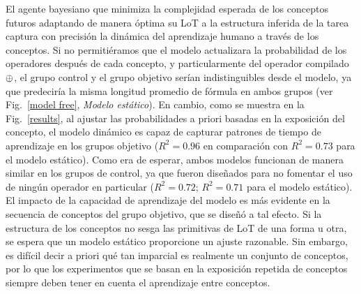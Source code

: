 El agente bayesiano que minimiza la complejidad esperada de los conceptos futuros adaptando de manera óptima su LoT a la estructura inferida de la tarea captura con precisión la dinámica del aprendizaje humano a través de los conceptos. Si no permitiéramos que el modelo actualizara la probabilidad de los operadores después de cada concepto, y particularmente del operador compilado $ \oplus $, el grupo control y el grupo objetivo serían indistinguibles desde el modelo, ya que predeciría la misma longitud promedio de fórmula en ambos grupos (ver Fig.~\ref{model free}, {\em Modelo estático}). En cambio, como se muestra en la Fig.~\ref{results}, al ajustar las probabilidades a priori basadas en la exposición del concepto, el modelo dinámico es capaz de capturar patrones de tiempo de aprendizaje en los grupos objetivo ($ R^{2} = 0.96 $ en comparación con $ R^{2} = 0.73 $ para el modelo estático). Como era de esperar, ambos modelos funcionan de manera similar en los grupos de control, ya que fueron diseñados para no fomentar el uso de ningún operador en particular ($ R^{2} = 0.72 $; $ R^{2} = 0.71 $ para el modelo estático). El impacto de la capacidad de aprendizaje del modelo es más evidente en la secuencia de conceptos del grupo objetivo, que se diseñó a tal efecto. Si la estructura de los conceptos no sesga las primitivas de LoT de una forma u otra, se espera que un modelo estático proporcione un ajuste razonable. Sin embargo, es difícil decir a priori qué tan imparcial es realmente un conjunto de conceptos, por lo que los experimentos que se basan en la exposición repetida de conceptos siempre deben tener en cuenta el aprendizaje entre conceptos.

